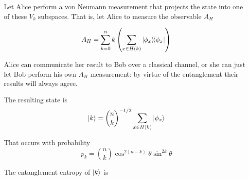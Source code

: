Let Alice perform a von Neumann measurement that projects the state into one of these $V_k$ subspaces. That is, let Alice to measure the observable $A_H$

\begin{align}
	A_H = \sum_{k=0}^n k \left( \sum_{x \in H(k)}  \dyad{\phi_x}{\phi_x} \right) 
\end{align}

Alice can communicate her result to Bob over a classical channel, or she can just let Bob perform his own $A_H$ measurement: by virtue of the entanglement their results will always agree.

The resulting state is
$$
\ket{k} = \binom{n}{k}^{-1/2} \sum_{x \in H(k)} \ket{\phi_x}
$$

That occurs with probability
$$
p_k = \binom{n}{k} \cos^{2(n-k)}\theta \sin^{2k}\theta
$$

The entanglement entropy of $\ket{k}$ is 
